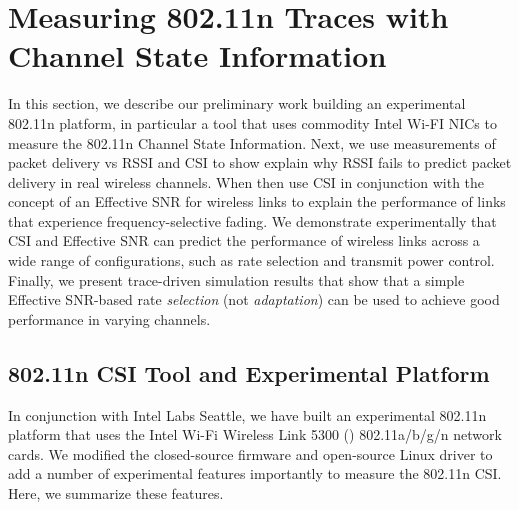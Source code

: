 \ifx\mainfile\undefined

\setcounter{chapter}{4} %
\fi

\cleardoublepage
\chapter{Measuring 802.11n Traces with Channel State Information}
\label{chap:esnr_intro}

In this section, we describe our preliminary work building an experimental 802.11n platform, in particular a tool that uses commodity Intel Wi-FI NICs to measure the 802.11n Channel State Information. Next, we use measurements of packet delivery vs RSSI and CSI to show explain why RSSI fails to predict packet delivery in real wireless channels. When then use CSI in conjunction with the concept of an Effective SNR for wireless links to explain the performance of links that experience frequency-selective fading. We demonstrate experimentally that CSI and Effective SNR can predict the performance of wireless links across a wide range of configurations, such as rate selection and transmit power control. Finally, we present trace-driven simulation results that show that a simple Effective SNR-based rate \emph{selection} (not \emph{adaptation}) can be used to achieve good performance in varying channels.

\section{802.11n CSI Tool and Experimental Platform}
\label{sec:platform}
In conjunction with Intel Labs Seattle, we have built an experimental 802.11n platform that uses the Intel Wi-Fi Wireless Link 5300 () 802.11a/b/g/n network cards. We modified the closed-source firmware and open-source Linux driver to add a number of experimental features importantly to measure the 802.11n CSI\@. Here, we summarize these features.

